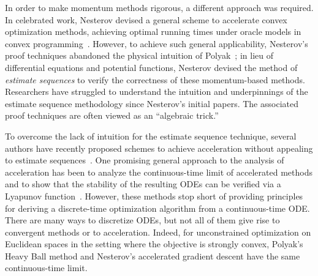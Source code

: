 \documentclass[11pt]{article}
\theoremstyle{plain}
\begin{document}
In order to make momentum methods rigorous, a different approach was required.  In celebrated work, Nesterov devised a general scheme to accelerate convex optimization methods, achieving optimal running times under oracle models in convex programming~\cite{Nesterov04}. However, to achieve such general applicability, Nesterov's proof techniques abandoned the physical intuition of Polyak~\cite{Nesterov04}; in lieu of differential equations and potential functions, Nesterov devised the method of \emph{estimate sequences} to verify the correctness of these momentum-based methods.  Researchers have struggled to understand the intuition and underpinnings of the estimate sequence methodology since Nesterov's initial papers.  The associated proof techniques are often viewed as an ``algebraic trick.''  

To overcome the lack of intuition for the estimate sequence technique, several authors have recently proposed schemes to achieve acceleration without appealing to estimate sequences~\cite{Fazel, BubeckLeeSingh15, Lessard14}.  One promising general approach to the analysis of acceleration has been to analyze the continuous-time limit of accelerated methods and to show that the stability of the resulting ODEs can be verified via a Lyapunov function~\cite{SuBoydCandes14,Krichene15,Acceleration}.  However, these methods stop short of providing principles for deriving a discrete-time optimization algorithm from a continuous-time ODE.  There are many ways to discretize ODEs, but not all of them give rise to convergent methods or to acceleration.  Indeed, for unconstrained optimization on Euclidean spaces in the setting where the objective is strongly convex, Polyak's Heavy Ball method and Nesterov's accelerated gradient descent have the same continuous-time limit.
\end{document}
